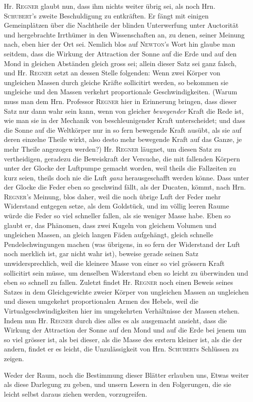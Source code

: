 Hr. \textsc{Regner} glaubt nun, dass ihm nichts weiter übrig sei, als noch Hrn. \textsc{Schubert}'s zweite Beschuldigung zu entkräften. Er fängt mit einigen Gemeinplätzen über die Nachtheile der blinden Unterwerfung unter Auctorität und hergebrachte Irrthümer in den Wissenschaften an, zu denen, seiner Meinung nach, eben hier der Ort sei. Nemlich blos auf \textsc{Newton}'s Wort hin glaube man seitdem, dass die Wirkung der Attraction der Sonne auf die Erde und auf den Mond in gleichen Abständen gleich gross sei; allein dieser Satz sei ganz falsch, und Hr. \textsc{Regner} setzt an dessen Stelle folgenden: Wenn zwei Körper von ungleichen Massen durch gleiche Kräfte sollicitirt werden, so bekommen sie ungleiche und den Massen verkehrt proportionale Geschwindigkeiten. (Warum muss man dem Hrn. Professor \textsc{Regner} hier in Erinnerung bringen, dass dieser Satz nur dann wahr sein kann, wenn von gleicher \emph{bewegender} Kraft die Rede ist, wie man sie in der Mechanik von beschleunigender Kraft unterscheidet; und dass die Sonne auf die Weltkörper nur in so fern bewegende Kraft ausübt, als sie auf deren einzelne Theile wirkt, also desto mehr bewegende Kraft auf das Ganze, je mehr Theile angezogen werden?) Hr. \textsc{Regner} läugnet, um diesen Satz zu vertheidigen, geradezu die Beweiskraft der Versuche, die mit fallenden Körpern unter der Glocke der Luftpumpe gemacht worden, weil theils die Fallzeiten zu kurz seien, theils doch nie die Luft \emph{ganz} herausgeschafft werden könne. Dass unter der Glocke die Feder eben so geschwind fällt, als der Ducaten, kömmt, nach Hrn. \textsc{Regner}'s Meinung, blos daher, weil die noch übrige Luft der Feder mehr Widerstand entgegen setze, als dem Goldstück, und im völlig leeren Raume würde die Feder so viel schneller fallen, als sie weniger Masse habe. Eben so glaubt er, das Phänomen, dass zwei Kugeln von gleichem Volumen und ungleichen Massen, an gleich langen Fäden aufgehängt, gleich schnelle Pendelschwingungen machen (was übrigens, in so fern der Widerstand der Luft noch merklich ist, gar nicht wahr ist), beweise gerade seinen Satz unwidersprechlich, weil die kleinere Masse von einer so viel grössern Kraft sollicitirt sein müsse, um denselben Widerstand eben so leicht zu überwinden und eben so schnell zu fallen. Zuletzt findet Hr. \textsc{Regner} noch einen Beweis seines Satzes in dem Gleichgewichte zweier Körper von ungleichen Massen an ungleichen und diesen umgekehrt proportionalen Armen des Hebels, weil die Virtualgeschwindigkeiten hier im umgekehrten Verhältnisse der Massen stehen. Indem nun Hr. \textsc{Regner} durch dies alles es als ausgemacht ansieht, dass die Wirkung der Attraction der Sonne auf den Mond und auf die Erde bei jenem um so viel grösser ist, als bei dieser, als die Masse des erstern kleiner ist, als die der andern, findet er es leicht, die Unzulässigkeit von Hrn. \textsc{Schubert}s Schlüssen zu zeigen.

Weder der Raum, noch die Bestimmung dieser Blätter erlauben uns, Etwas weiter als diese Darlegung zu geben, und unsern Lesern in den Folgerungen, die sie leicht selbst daraus ziehen werden, vorzugreifen.
